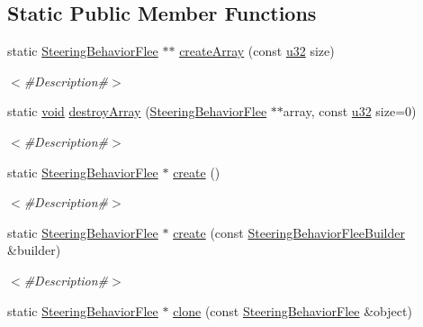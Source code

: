 \subsection*{Static Public Member Functions}
\begin{DoxyCompactItemize}
\item 
static \mbox{\hyperlink{classnjli_1_1_steering_behavior_flee}{Steering\+Behavior\+Flee}} $\ast$$\ast$ \mbox{\hyperlink{classnjli_1_1_steering_behavior_flee_a3424227cb7b8018b59977e6936339a54}{create\+Array}} (const \mbox{\hyperlink{_util_8h_a10e94b422ef0c20dcdec20d31a1f5049}{u32}} size)
\begin{DoxyCompactList}\small\item\em $<$\#\+Description\#$>$ \end{DoxyCompactList}\item 
static \mbox{\hyperlink{_thread_8h_af1e856da2e658414cb2456cb6f7ebc66}{void}} \mbox{\hyperlink{classnjli_1_1_steering_behavior_flee_a9ac450b31fed9a4d9a92c6b5a8dfb6f0}{destroy\+Array}} (\mbox{\hyperlink{classnjli_1_1_steering_behavior_flee}{Steering\+Behavior\+Flee}} $\ast$$\ast$array, const \mbox{\hyperlink{_util_8h_a10e94b422ef0c20dcdec20d31a1f5049}{u32}} size=0)
\begin{DoxyCompactList}\small\item\em $<$\#\+Description\#$>$ \end{DoxyCompactList}\item 
static \mbox{\hyperlink{classnjli_1_1_steering_behavior_flee}{Steering\+Behavior\+Flee}} $\ast$ \mbox{\hyperlink{classnjli_1_1_steering_behavior_flee_aeb7779c2210d42ebe0eaee865063c6c9}{create}} ()
\begin{DoxyCompactList}\small\item\em $<$\#\+Description\#$>$ \end{DoxyCompactList}\item 
static \mbox{\hyperlink{classnjli_1_1_steering_behavior_flee}{Steering\+Behavior\+Flee}} $\ast$ \mbox{\hyperlink{classnjli_1_1_steering_behavior_flee_aee8887a111ab2c8a08c6d31e42e8dbdb}{create}} (const \mbox{\hyperlink{classnjli_1_1_steering_behavior_flee_builder}{Steering\+Behavior\+Flee\+Builder}} \&builder)
\begin{DoxyCompactList}\small\item\em $<$\#\+Description\#$>$ \end{DoxyCompactList}\item 
static \mbox{\hyperlink{classnjli_1_1_steering_behavior_flee}{Steering\+Behavior\+Flee}} $\ast$ \mbox{\hyperlink{classnjli_1_1_steering_behavior_flee_ab1b25c046e2b7f1333762e467d822669}{clone}} (const \mbox{\hyperlink{classnjli_1_1_steering_behavior_flee}{Steering\+Behavior\+Flee}} \&object)

\end{DoxyCompactItemize}
